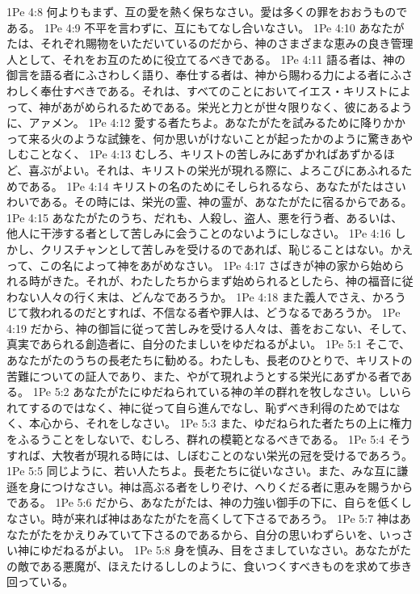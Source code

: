 1Pe 4:8  何よりもまず、互の愛を熱く保ちなさい。愛は多くの罪をおおうものである。
1Pe 4:9  不平を言わずに、互にもてなし合いなさい。
1Pe 4:10  あなたがたは、それぞれ賜物をいただいているのだから、神のさまざまな恵みの良き管理人として、それをお互のために役立てるべきである。
1Pe 4:11  語る者は、神の御言を語る者にふさわしく語り、奉仕する者は、神から賜わる力による者にふさわしく奉仕すべきである。それは、すべてのことにおいてイエス・キリストによって、神があがめられるためである。栄光と力とが世々限りなく、彼にあるように、アァメン。
1Pe 4:12  愛する者たちよ。あなたがたを試みるために降りかかって来る火のような試錬を、何か思いがけないことが起ったかのように驚きあやしむことなく、
1Pe 4:13  むしろ、キリストの苦しみにあずかればあずかるほど、喜ぶがよい。それは、キリストの栄光が現れる際に、よろこびにあふれるためである。
1Pe 4:14  キリストの名のためにそしられるなら、あなたがたはさいわいである。その時には、栄光の霊、神の霊が、あなたがたに宿るからである。
1Pe 4:15  あなたがたのうち、だれも、人殺し、盗人、悪を行う者、あるいは、他人に干渉する者として苦しみに会うことのないようにしなさい。
1Pe 4:16  しかし、クリスチャンとして苦しみを受けるのであれば、恥じることはない。かえって、この名によって神をあがめなさい。
1Pe 4:17  さばきが神の家から始められる時がきた。それが、わたしたちからまず始められるとしたら、神の福音に従わない人々の行く末は、どんなであろうか。
1Pe 4:18  また義人でさえ、かろうじて救われるのだとすれば、不信なる者や罪人は、どうなるであろうか。
1Pe 4:19  だから、神の御旨に従って苦しみを受ける人々は、善をおこない、そして、真実であられる創造者に、自分のたましいをゆだねるがよい。
1Pe 5:1  そこで、あなたがたのうちの長老たちに勧める。わたしも、長老のひとりで、キリストの苦難についての証人であり、また、やがて現れようとする栄光にあずかる者である。
1Pe 5:2  あなたがたにゆだねられている神の羊の群れを牧しなさい。しいられてするのではなく、神に従って自ら進んでなし、恥ずべき利得のためではなく、本心から、それをしなさい。
1Pe 5:3  また、ゆだねられた者たちの上に権力をふるうことをしないで、むしろ、群れの模範となるべきである。
1Pe 5:4  そうすれば、大牧者が現れる時には、しぼむことのない栄光の冠を受けるであろう。
1Pe 5:5  同じように、若い人たちよ。長老たちに従いなさい。また、みな互に謙遜を身につけなさい。神は高ぶる者をしりぞけ、へりくだる者に恵みを賜うからである。
1Pe 5:6  だから、あなたがたは、神の力強い御手の下に、自らを低くしなさい。時が来れば神はあなたがたを高くして下さるであろう。
1Pe 5:7  神はあなたがたをかえりみていて下さるのであるから、自分の思いわずらいを、いっさい神にゆだねるがよい。
1Pe 5:8  身を慎み、目をさましていなさい。あなたがたの敵である悪魔が、ほえたけるししのように、食いつくすべきものを求めて歩き回っている。
